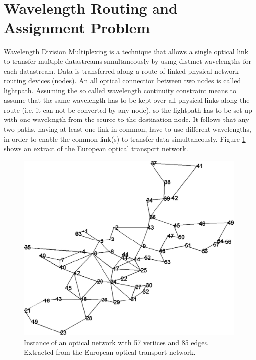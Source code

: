 \section{Wavelength Routing and Assignment Problem}

Wavelength Division Multiplexing is a technique that allows a single optical link to transfer multiple datastreams simultaneously by using distinct wavelengths for each datastream. Data is transferred along a route of linked physical network routing devices (nodes). An all optical connection between two nodes is called lightpath. Assuming the so called wavelength continuity constraint \cite{markovic-10} means to assume that the same wavelength has to be kept over all physical links along the route (i.e. it can not be converted by any node), so the lightpath has to be set up with one wavelength from the source to the destination node. It follows that any two paths, having at least one link in common, have to use different wavelengths, in order to enable the common link(s) to transfer data simultaneously. Figure \ref{pd:opticalNetwork} shows an extract of the European optical transport network.\\

\begin{figure}
\begin{center}
\includegraphics[scale=0.2]{figures/rwa.png}
\caption{Instance of an optical network with 57 vertices and 85 edges. Extracted from the European optical transport network. \cite{belgacem-13}}
\label{pd:opticalNetwork}
\end{center}
\end{figure}
  
